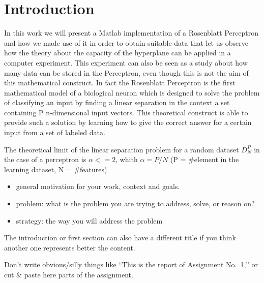 \section{Introduction}
\label{sec:introduction}

In this work we will present a Matlab implementation of a Rosenblatt Perceptron \cite{rosenblatt1958perceptron}
and how we made use of it in order to obtain suitable data that let us observe how the theory about the capacity of the
hyperplane can be applied in a computer experiment. This experiment can also be seen as a study about how many
data can be stored in the Perceptron, even though this is not the aim of this mathematical construct.
In fact the Rosenblatt Perceptron is the first mathematical model of a biological neuron which is designed to
solve the problem of classifying an input by finding a linear separation in the context a set containing P n-dimensional input vectors.
This theoretical construct is able to provide such a solution by learning how to give the correct answer for a certain input
from a set of labeled data.

The theoretical limit of the linear separation problem for a random dataset $D^P_N$ in the case of a perceptron is $\alpha <= 2$, whith $\alpha = P/N$
(P = \#element in the learning dataset, N = \#features)



\begin{itemize}
\item general motivation for your work, context and goals.
\item problem: what is the problem you are trying to address, solve, or reason on?
\item strategy: the way you will address the problem
\end{itemize}

The introduction or first section can also have a different title if you think another one represents better the content. 

Don't write obvious/silly things like ``This is the report of Assignment No.\ 1,'' or cut \& paste here parts of the assignment. 
